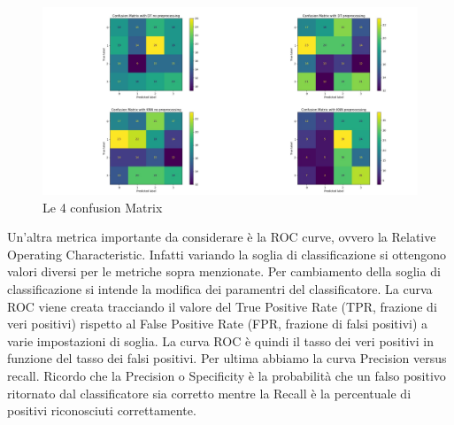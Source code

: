 \begin{figure}[H]
    \centering
    \includegraphics[width=1.1\columnwidth]{figures/Merge of Confusion Matrix.png}
    \caption{Le 4 confusion Matrix}
    \label{fig:target}
\end{figure}

Un'altra metrica importante da considerare è la ROC curve, ovvero la Relative Operating Characteristic. Infatti variando la soglia di classificazione si ottengono valori diversi per le metriche sopra menzionate. Per cambiamento della soglia di classificazione si intende la modifica dei paramentri del classificatore. 
La curva ROC viene creata tracciando il valore del True Positive Rate (TPR, frazione di veri positivi) rispetto al False Positive Rate (FPR, frazione di falsi positivi) a varie impostazioni di soglia. La curva ROC è quindi il tasso dei veri positivi in funzione del tasso dei falsi positivi.
\newline Per ultima abbiamo la curva Precision versus recall. Ricordo che la Precision o Specificity è la probabilità che un falso positivo ritornato dal classificatore sia corretto mentre la Recall è la percentuale di positivi riconosciuti correttamente. 
